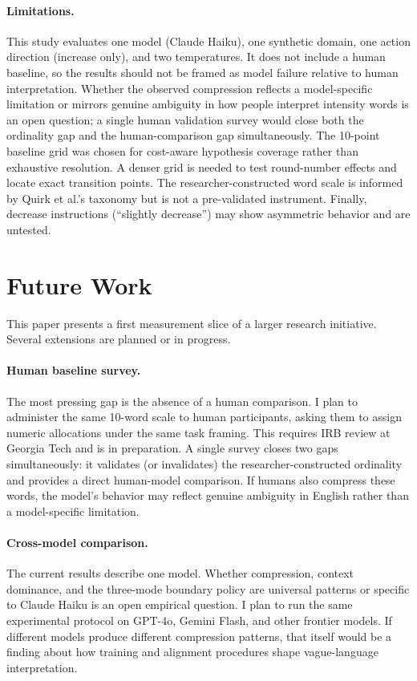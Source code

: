 \documentclass[11pt]{article}
\begin{document}
\paragraph{Limitations.}
This study evaluates one model (Claude Haiku), one synthetic domain, one action direction (increase only), and two temperatures. It does not include a human baseline, so the results should not be framed as model failure relative to human interpretation. Whether the observed compression reflects a model-specific limitation or mirrors genuine ambiguity in how people interpret intensity words is an open question; a single human validation survey would close both the ordinality gap and the human-comparison gap simultaneously. The 10-point baseline grid was chosen for cost-aware hypothesis coverage rather than exhaustive resolution. A denser grid is needed to test round-number effects and locate exact transition points. The researcher-constructed word scale is informed by Quirk et al.'s taxonomy but is not a pre-validated instrument. Finally, decrease instructions (``slightly decrease'') may show asymmetric behavior and are untested.

\section{Future Work}

This paper presents a first measurement slice of a larger research initiative. Several extensions are planned or in progress.

\paragraph{Human baseline survey.}
The most pressing gap is the absence of a human comparison. I plan to administer the same 10-word scale to human participants, asking them to assign numeric allocations under the same task framing. This requires IRB review at Georgia Tech and is in preparation. A single survey closes two gaps simultaneously: it validates (or invalidates) the researcher-constructed ordinality and provides a direct human-model comparison. If humans also compress these words, the model's behavior may reflect genuine ambiguity in English rather than a model-specific limitation.

\paragraph{Cross-model comparison.}
The current results describe one model. Whether compression, context dominance, and the three-mode boundary policy are universal patterns or specific to Claude Haiku is an open empirical question. I plan to run the same experimental protocol on GPT-4o, Gemini Flash, and other frontier models. If different models produce different compression patterns, that itself would be a finding about how training and alignment procedures shape vague-language interpretation.
\end{document}
